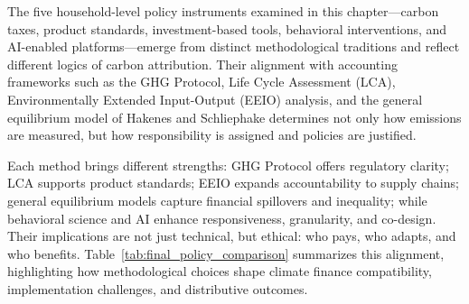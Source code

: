 \documentclass[12pt,a4paper]{article}%
\begin{document}
The five household-level policy instruments examined in this chapter—carbon taxes, product standards, investment-based tools, behavioral interventions, and AI-enabled platforms—emerge from distinct methodological traditions and reflect different logics of carbon attribution. Their alignment with accounting frameworks such as the GHG Protocol, Life Cycle Assessment (LCA), Environmentally Extended Input-Output (EEIO) analysis, and the general equilibrium model of Hakenes and Schliephake determines not only how emissions are measured, but how responsibility is assigned and policies are justified.

Each method brings different strengths: GHG Protocol offers regulatory clarity; LCA supports product standards; EEIO expands accountability to supply chains; general equilibrium models capture financial spillovers and inequality; while behavioral science and AI enhance responsiveness, granularity, and co-design. Their implications are not just technical, but ethical: who pays, who adapts, and who benefits. Table~\ref{tab:final_policy_comparison} summarizes this alignment, highlighting how methodological choices shape climate finance compatibility, implementation challenges, and distributive outcomes.
\end{document}
